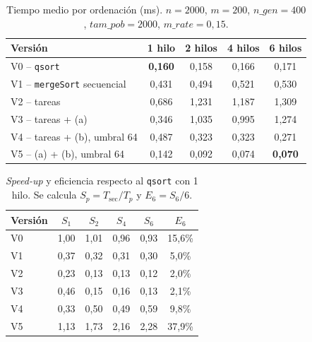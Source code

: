 \documentclass[12pt]{article}
\begin{document}
\begin{enumerate}
\begin{table}[htbp]
    \centering
    \small
    \begin{tabular}{lcccc}
        \toprule
        \textbf{Versión} & \textbf{1 hilo} & \textbf{2 hilos} & \textbf{4 hilos} & \textbf{6 hilos} \\
        \midrule
        V0 -- \texttt{qsort}                 & \textbf{0,160} & 0,158 & 0,166 & 0,171 \\
        V1 -- \texttt{mergeSort} secuencial  & 0,431 & 0,494 & 0,521 & 0,530 \\
        V2 -- tareas                         & 0,686 & 1,231 & 1,187 & 1,309 \\
        V3 -- tareas + (a)                   & 0,346 & 1,035 & 0,995 & 1,274 \\
        V4 -- tareas + (b), umbral 64        & 0,487 & 0,323 & 0,323 & 0,271 \\
        V5 -- (a) + (b), umbral 64           & 0,142 & 0,092 & 0,074 & \textbf{0,070} \\
        \bottomrule
    \end{tabular}
    \caption{Tiempo medio por ordenación (ms). $n = 2000$, $m = 200$, $n\_gen = 400$, $tam\_pob = 2000$, $m\_rate = 0,15$.}
    \label{tab:c6_tiempocass}
\end{table}
 
\begin{table}[htbp]
    \centering
    \small
    \begin{tabular}{lccccc}
        \toprule
        \textbf{Versión} & \textbf{$S_1$} & \textbf{$S_2$} & \textbf{$S_4$} & \textbf{$S_6$} & \textbf{$E_6$} \\
        \midrule
        V0 & 1,00 & 1,01 & 0,96 & 0,93 & 15,6\% \\
        V1 & 0,37 & 0,32 & 0,31 & 0,30 & 5,0\% \\
        V2 & 0,23 & 0,13 & 0,13 & 0,12 & 2,0\% \\
        V3 & 0,46 & 0,15 & 0,16 & 0,13 & 2,1\% \\
        V4 & 0,33 & 0,50 & 0,49 & 0,59 & 9,8\% \\
        V5 & 1,13 & 1,73 & 2,16 & 2,28 & 37,9\% \\
        \bottomrule
    \end{tabular}
    \caption{\textit{Speed-up} y eficiencia respecto al \texttt{qsort} con 1 hilo. Se calcula $S_p=T_{\text{sec}}/T_p$ y $E_6=S_6/6$.}
    \label{tab:c6_spdsdeedup}
\end{table}
 

\end{enumerate}
\end{document}

